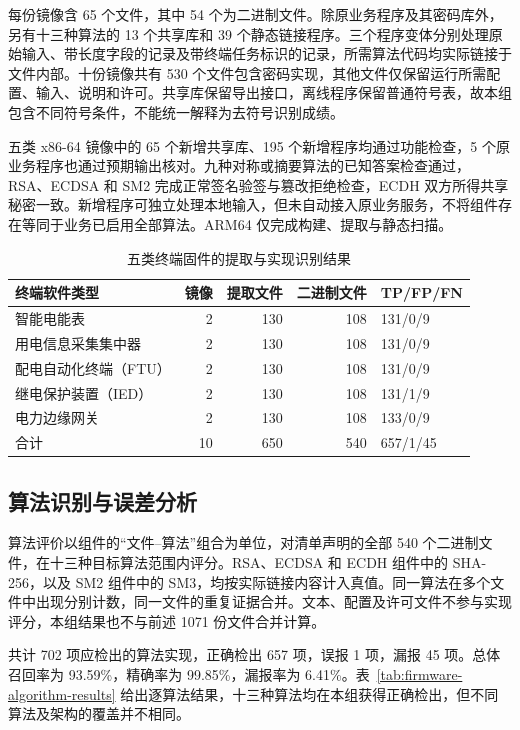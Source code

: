 每份镜像含 65 个文件，其中 54 个为二进制文件。除原业务程序及其密码库外，另有十三种算法的 13 个共享库和 39 个静态链接程序。三个程序变体分别处理原始输入、带长度字段的记录及带终端任务标识的记录，所需算法代码均实际链接于文件内部。十份镜像共有 530 个文件包含密码实现，其他文件仅保留运行所需配置、输入、说明和许可。共享库保留导出接口，离线程序保留普通符号表，故本组包含不同符号条件，不能统一解释为去符号识别成绩。

五类 x86-64 镜像中的 65 个新增共享库、195 个新增程序均通过功能检查，5 个原业务程序也通过预期输出核对。九种对称或摘要算法的已知答案检查通过，RSA、ECDSA 和 SM2 完成正常签名验签与篡改拒绝检查，ECDH 双方所得共享秘密一致。新增程序可独立处理本地输入，但未自动接入原业务服务，不将组件存在等同于业务已启用全部算法。ARM64 仅完成构建、提取与静态扫描。

\begin{table}[H]\centering\small
\caption{五类终端固件的提取与实现识别结果}
\label{tab:terminal-coverage-results}
\begin{tabularx}{\linewidth}{@{}Xrrrl@{}}\toprule
终端软件类型 & 镜像 & 提取文件 & 二进制文件 & TP/FP/FN\\\midrule
智能电能表 & 2 & 130 & 108 & 131/0/9\\
用电信息采集集中器 & 2 & 130 & 108 & 131/0/9\\
配电自动化终端（FTU） & 2 & 130 & 108 & 131/0/9\\
继电保护装置（IED） & 2 & 130 & 108 & 131/1/9\\
电力边缘网关 & 2 & 130 & 108 & 133/0/9\\
合计 & 10 & 650 & 540 & 657/1/45\\\bottomrule
\end{tabularx}
\end{table}

\subsection{算法识别与误差分析}

算法评价以组件的“文件--算法”组合为单位，对清单声明的全部 540 个二进制文件，在十三种目标算法范围内评分。RSA、ECDSA 和 ECDH 组件中的 SHA-256，以及 SM2 组件中的 SM3，均按实际链接内容计入真值。同一算法在多个文件中出现分别计数，同一文件的重复证据合并。文本、配置及许可文件不参与实现评分，本组结果也不与前述 1071 份文件合并计算。

共计 702 项应检出的算法实现，正确检出 657 项，误报 1 项，漏报 45 项。总体召回率为 93.59\%，精确率为 99.85\%，漏报率为 6.41\%。表~\ref{tab:firmware-algorithm-results} 给出逐算法结果，十三种算法均在本组获得正确检出，但不同算法及架构的覆盖并不相同。


